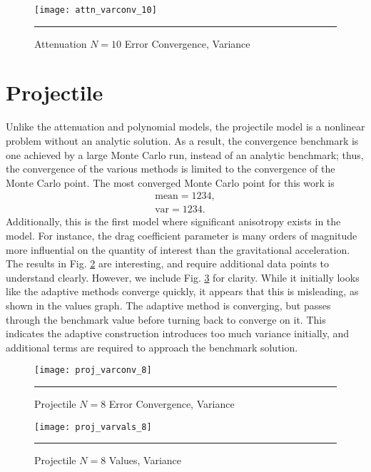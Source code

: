\begin{figure}[H]
  \centering
    \texttt{[image: attn\_varconv\_10]}
    \rule{35em}{0.5pt}
  \caption{Attenuation $N=10$ Error Convergence, Variance}
  \label{fig:att10_varconv}
\end{figure}



\section{Projectile}
Unlike the attenuation and polynomial models, the projectile model is a nonlinear problem without an analytic
solution.  As a result, the convergence benchmark is one achieved by a large Monte Carlo run, instead of an
analytic benchmark; thus, the convergence of the various methods is limited to the convergence of the Monte
Carlo point.  The most converged Monte Carlo point for this work is
\begin{align}
  \text{mean} = 1234, \\
  \text{var} = 1234.
\end{align}
Additionally, this is the first model where significant anisotropy exists in the model.  For instance, the
drag coefficient parameter is many orders of magnitude more influential on the quantity of interest than the
gravitational acceleration.  
The results in Fig. \ref{fig:proj_varconv} are interesting, and require additional data points to understand
clearly.  However, we include Fig. \ref{fig:proj_varval} for clarity.  While it initially looks like the adaptive
methods converge quickly, it appears that this is misleading, as shown in the values graph.  The adaptive
method is converging, but passes through the benchmark value before turning back to converge on it.  This
indicates the adaptive construction introduces too much variance initially, and additional terms are required
to approach the benchmark solution.
\begin{figure}[H]
  \centering
    \texttt{[image: proj\_varconv\_8]}
    \rule{35em}{0.5pt}
  \caption{Projectile $N=8$ Error Convergence, Variance}
  \label{fig:proj_varconv}
\end{figure}
\begin{figure}[H]
  \centering
    \texttt{[image: proj\_varvals\_8]}
    \rule{35em}{0.5pt}
  \caption{Projectile $N=8$ Values, Variance}
  \label{fig:proj_varval}
\end{figure}



